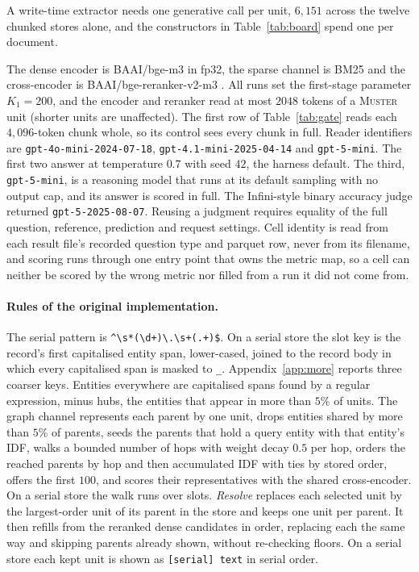 \documentclass{article}
\newcommand{\sys}{\textsc{Muster}}
\begin{document}
A write-time extractor needs one generative call per unit, $6{,}151$ across the twelve chunked
stores alone, and the constructors in Table~\ref{tab:board} spend one per document.

The dense encoder is BAAI/bge-m3 \cite{bgem3} in fp32, the sparse channel is BM25 and
the cross-encoder is BAAI/bge-reranker-v2-m3 \cite{bgererank}. All runs set the first-stage parameter $K_1=200$, and the encoder and reranker
read at most $2048$ tokens of a \sys{} unit (shorter units are unaffected). The first row of Table~\ref{tab:gate} reads each $4{,}096$-token chunk whole, so its control sees every chunk in full. Reader identifiers are \texttt{gpt-4o-mini-2024-07-18},
\texttt{gpt-4.1-mini-2025-04-14} and \texttt{gpt-5-mini}. The first two answer at temperature $0.7$ with
seed $42$, the harness default. The third, \texttt{gpt-5-mini}, is a reasoning model that runs at its default sampling
with no output cap, and its answer is scored in full.
The Infini-style binary accuracy judge returned \texttt{gpt-5-2025-08-07}.
Reusing a judgment requires equality of the full question, reference, prediction and request settings.
Cell identity is read from each result file's recorded question type and parquet row, never from its
filename, and scoring runs through one entry point that owns the metric map, so a cell can neither be
scored by the wrong metric nor filled from a run it did not come from.

\paragraph{Rules of the original implementation.} The serial pattern is
\verb|^\s*(\d+)\.\s+(.+)$|. On a serial store the slot key is the record's first capitalised entity
span, lower-cased, joined to the record body in which every capitalised span is masked to \texttt{\_}.
Appendix~\ref{app:more} reports three coarser keys. Entities everywhere are capitalised spans found by a
regular expression, minus hubs, the entities that appear in more than $5\%$ of units. The graph channel
represents each parent by one unit, drops entities shared by more than $5\%$ of parents, seeds the parents that hold a query entity with that entity's IDF,
walks a bounded number of hops with weight decay $0.5$ per hop, orders the reached parents by hop and
then accumulated IDF with ties by stored order, offers the first $100$, and scores their representatives
with the shared cross-encoder. On a serial store the walk runs over slots. \emph{Resolve} replaces each selected unit by the largest-order unit of its parent in the store and keeps one unit per parent. It then refills from the reranked dense candidates in order, replacing each the same way and skipping parents already shown, without re-checking floors. On a serial store each kept unit is shown as \texttt{[serial] text} in serial order.
\end{document}
